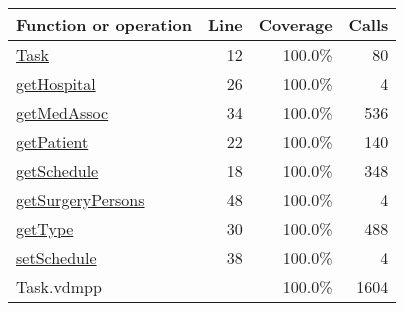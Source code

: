 \begin{longtable}{|l|r|r|r|}
\hline
Function or operation & Line & Coverage & Calls \\
\hline
\hline
\hyperref[Task:12]{Task} & 12&100.0\% & 80 \\
\hline
\hyperref[getHospital:26]{getHospital} & 26&100.0\% & 4 \\
\hline
\hyperref[getMedAssoc:34]{getMedAssoc} & 34&100.0\% & 536 \\
\hline
\hyperref[getPatient:22]{getPatient} & 22&100.0\% & 140 \\
\hline
\hyperref[getSchedule:18]{getSchedule} & 18&100.0\% & 348 \\
\hline
\hyperref[getSurgeryPersons:48]{getSurgeryPersons} & 48&100.0\% & 4 \\
\hline
\hyperref[getType:30]{getType} & 30&100.0\% & 488 \\
\hline
\hyperref[setSchedule:38]{setSchedule} & 38&100.0\% & 4 \\
\hline
\hline
Task.vdmpp & & 100.0\% & 1604 \\
\hline
\end{longtable}

